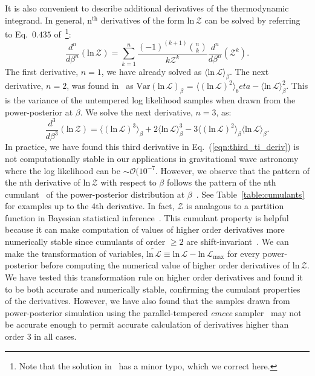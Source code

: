 It is also convenient to describe additional derivatives of the thermodynamic integrand. In general, $\mathrm{n}^{\mathrm{th}}$ derivatives of the form $\mathrm{ln} \, \mathcal{Z}$ can be solved by referring to Eq.~$0.435$ of~\cite{gradshteyn2015table}\footnote{Note that the solution in~\cite{gradshteyn2015table} has a minor typo, which we correct here.}:
\begin{equation}\label{eqn:gradshteyn_derivatives}
    \frac{d^n}{d\beta^n}\left( \mathrm{ln} \, \mathcal{Z} \right) = \sum_{k=1}^{n} \frac{(-1)^{(k+1)} {{n}\choose{k}}}{k \mathcal{Z}^k} \frac{d^n}{d\beta^n} \left(\mathcal{Z}^k\right).
\end{equation}
The first derivative, $n=1$, we have already solved as $\langle \mathrm{ln} \, \mathcal{L} \rangle_\beta$. The next derivative, $n=2$, was found in~\cite{friel2014improving} as $\mathrm{Var}(\mathrm{ln} \, \mathcal{L})_\beta$ = $\langle (\mathrm{ln} \, \mathcal{L})^2\rangle_beta - \langle \mathrm{ln} \, \mathcal{L} \rangle^2_\beta$. This is the variance of the untempered log likelihood samples when drawn from the power-posterior at $\beta$. We solve the next derivative, $n=3$, as:
\begin{equation}\label{eqn:third_ti_deriv}
    \frac{d^3}{d\beta^3}\left( \mathrm{ln} \, \mathcal{Z}\right) = \langle \left(\mathrm{ln} \, \mathcal{L} \right)^3\rangle_\beta + 2 \langle \mathrm{ln} \, \mathcal{L} \rangle^3_\beta - 3 \langle \left(\mathrm{ln} \, \mathcal{L} \right)^2\rangle_\beta \langle \mathrm{ln} \, \mathcal{L}\rangle_\beta.
\end{equation}
In practice, we have found this third derivative in Eq.~(\ref{eqn:third_ti_deriv}) is not computationally stable in our applications in gravitational wave astronomy where the log likelihood can be $\sim\mathcal{O}(10^{-7}$. However, we observe that the pattern of the nth derivative of $\mathrm{ln} \, \mathcal{Z}$ with respect to $\beta$ follows the pattern of the nth cumulant~\citep{kardar2007statistical} of the power-posterior distribution at $\beta$~\cite{carlson2016partition}. See Table~\ref{table:cumulants} for examples up to the $4$th derivative. In fact, $\mathcal{Z}$ is analagous to a partition function in Bayesian statistical inference~\citep{carlson2016partition, lamont2019correspondence}. This cumulant property is helpful because it can make computation of values of higher order derivatives more numerically stable since cumulants of order $\ge 2$ are shift-invariant~\cite{kardar2007statistical}. We can make the transformation of variables, $\widetilde{\mathrm{ln} \, \mathcal{L}} \equiv \mathrm{ln} \, \mathcal{L} - \mathrm{ln} \, \mathcal{L}_{\mathrm{max}}$ for every power-posterior before computing the numerical value of higher order derivatives of $\mathrm{ln} \, \mathcal{Z}$. We have tested this transformation rule on higher order derivatives and found it to be both accurate and numerically stable, confirming the cumulant properties of the derivatives. However, we have also found that the samples drawn from power-posterior simulation using the parallel-tempered \emph{emcee} sampler~\citep{emcee,vousden:2016} may not be accurate enough to permit accurate calculation of derivatives higher than order $3$ in all cases.

